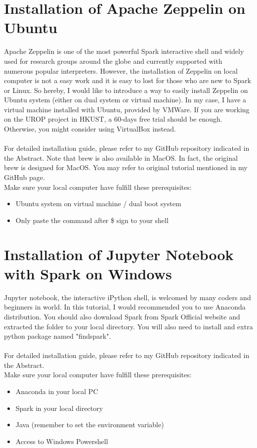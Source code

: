 \documentclass[a4paper, 12pt]{article}
\begin{document}
    \section*{Installation of Apache Zeppelin on Ubuntu}
    Apache Zeppelin is one of the most powerful Spark interactive shell and widely used for research groups
    around the globe and currently supported with numerous popular interpreters\cite{Zeppelin}. However, 
    the installation of Zeppelin on local computer is not a easy work and it is easy to lost for those who
    are new to Spark or Linux. So hereby, I would like to introduce a way to easily install Zeppelin on 
    Ubuntu system (either on dual system or virtual machine). In my case, I have a virtual machine installed
    with Ubuntu, provided by VMWare\cite{VMWare}. If you are working on the UROP project in HKUST, a 60-days
    free trial should be enough. Otherwise, you might consider using VirtualBox\cite{VirtualBox} instead.\\
    \\
    For detailed installation guide, please refer to my GitHub repository indicated in the Abstract. 
    Note that brew is also available in MacOS. In fact, the original brew is designed for MacOS. You 
    may refer to original tutorial mentioned in my GitHub page.
    \\
    Make sure your local computer have fulfill these prerequisites:
    \begin{itemize}
        \item Ubuntu system on virtual machine / dual boot system
        \item Only paste the command after \$ sign to your shell
    \end{itemize}

    \section*{Installation of Jupyter Notebook with Spark on Windows}
    Jupyter notebook, the interactive iPython shell, is welcomed by many coders and beginners in world. 
    In this tutorial, I would recommended you to use Anaconda distribution\cite{Anaconda}. You should 
    also download Spark from Spark Official website\cite{spark} and extracted the folder to your 
    local directory. You will also need to install and extra python package named "findspark".\\
    \\
    For detailed installation guide, please refer to my GitHub repository indicated in the Abstract.
    \\
    Make sure your local computer have fulfill these prerequisites:
    \begin{itemize}
        \item Anaconda in your local PC
        \item Spark in your local directory
        \item Java (remember to set the environment variable)
        \item Access to Windows Powershell
    \end{itemize}
    
\end{document}
